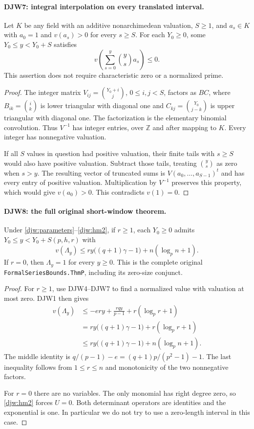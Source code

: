 \paragraph{DJW7: integral interpolation on every translated interval.}
\label{claim:DJW7}
Let $K$ be any field with an additive nonarchimedean valuation,
$S\ge1$, and $a_s\in K$ with $a_0=1$ and $v(a_s)>0$ for
every $s\ge S$.  For each $Y_0\ge0$, some
$Y_0\le y<Y_0+S$ satisfies
\[
 v\left(\sum_{s=0}^{y}\binom ys a_s\right)\le0.
\]
This assertion does not require characteristic zero or a normalized
prime.

\begin{proof}
The integer matrix
$V_{ij}=\binom{Y_0+i}{j}$, $0\le i,j<S$, factors as $BC$,
where $B_{ik}=\binom ik$ is lower triangular with diagonal one
and $C_{kj}=\binom{Y_0}{j-k}$ is upper triangular with diagonal
one.  The factorization is the elementary binomial convolution.
Thus $V^{-1}$ has integer entries, over $\mathbb Z$ and after
mapping to $K$.  Every integer has nonnegative valuation.

If all $S$ values in question had positive valuation, their finite
tails with $s\ge S$ would also have positive valuation.  Subtract
those tails, treating $\binom ys$ as zero when $s>y$.
The resulting vector of truncated sums is
$V(a_0,\ldots,a_{S-1})^t$ and has every entry of positive valuation.
Multiplication by $V^{-1}$ preserves this property, which would
give $v(a_0)>0$.  This contradicts $v(1)=0$.
\end{proof}

\paragraph{DJW8: the full original short-window theorem.}
\label{claim:DJW8}
Under \eqref{djw:parameters}--\eqref{djw:hm2}, if $r\ge1$,
each $Y_0\ge0$ admits $Y_0\le y<Y_0+S(p,h,r)$ with
\begin{equation}
 v(\Lambda_y)\le
 ry\bigl((q+1)\gamma-1\bigr)+n(\log_p n+1).
 \label{djw:thmp}
\end{equation}
If $r=0$, then $\Lambda_y=1$ for every $y\ge0$.
This is the complete original
\texttt{FormalSeriesBounds.ThmP}, including its zero-size conjunct.

\begin{proof}
For $r\ge1$, use DJW4--DJW7 to find a normalized value with
valuation at most zero.  DJW1 then gives
\begin{align*}
 v(\Lambda_y)
 &\le-ery+\frac{rqy}{p-1}+r(\log_pr+1)\\
 &=ry\bigl((q+1)\gamma-1\bigr)+r(\log_pr+1)\\
 &\le ry\bigl((q+1)\gamma-1\bigr)+n(\log_pn+1).
\end{align*}
The middle identity is $q/(p-1)-e=(q+1)p/(p^2-1)-1$.
The last inequality follows from $1\le r\le n$ and monotonicity
of the two nonnegative factors.

For $r=0$ there are no variables.  The only monomial has right
degree zero, so \eqref{djw:hm2} forces $U=0$.  Both determinant
operators are identities and the exponential is one.  In particular
we do not try to use a zero-length interval in this case.
\end{proof}

